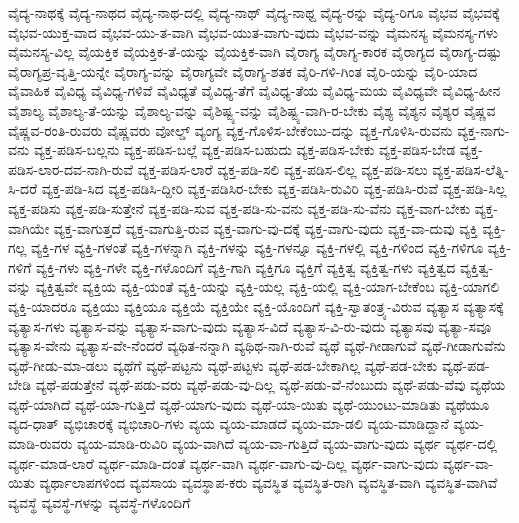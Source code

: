{ವೈದ್ಯ-ನಾಥಕ್ಕೆ
ವೈದ್ಯ-ನಾಥದ
ವೈದ್ಯ-ನಾಥ-ದಲ್ಲಿ
ವೈದ್ಯ-ನಾಥ್
ವೈದ್ಯ-ನಾಥ್ದ
ವೈದ್ಯ-ರನ್ನು
ವೈದ್ಯ-ರಿಗೂ
ವೈಭವ
ವೈಭವಕ್ಕೆ
ವೈಭವ-ಯುಕ್ತ-ವಾದ
ವೈಭವ-ಯು-ತ-ವಾಗಿ
ವೈಭವ-ಯುತ-ವಾಗು-ವುದು
ವೈಭವ-ವನ್ನು
ವೈಮನಸ್ಯ
ವೈಮನಸ್ಯ-ಗಳು
ವೈಮನಸ್ಯ-ವಿಲ್ಲ
ವೈಯಕ್ತಿಕ
ವೈಯಕ್ತಿಕ-ತೆ-ಯನ್ನು
ವೈಯಕ್ತಿಕ-ವಾಗಿ
ವೈರಾಗ್ಯ
ವೈರಾಗ್ಯ-ಕಾರಕ
ವೈರಾಗ್ಯದ
ವೈರಾಗ್ಯ-ದಷ್ಟು
ವೈರಾಗ್ಯಪ್ರ-ವೃತ್ತಿ-ಯನ್ನೇ
ವೈರಾಗ್ಯ-ವನ್ನು
ವೈರಾಗ್ಯವೇ
ವೈರಾಗ್ಯ-ಶತಕ
ವೈರಿ-ಗಳಿ-ಗಿಂತ
ವೈರಿ-ಯನ್ನು
ವೈರಿ-ಯಾದ
ವೈವಾಹಿಕ
ವೈವಿಧ್ಯ
ವೈವಿಧ್ಯ-ಗಳಿವೆ
ವೈವಿಧ್ಯತೆ
ವೈವಿಧ್ಯ-ತೆಗೆ
ವೈವಿಧ್ಯ-ತೆಯ
ವೈವಿಧ್ಯ-ಮಯ
ವೈವಿಧ್ಯವೇ
ವೈವಿಧ್ಯ-ಹೀನ
ವೈಶಾಲ್ಯ
ವೈಶಾಲ್ಯ-ತೆ-ಯನ್ನು
ವೈಶಾಲ್ಯ-ವನ್ನು
ವೈಶಿಷ್ಟ್ಯ-ವನ್ನು
ವೈಶಿಷ್ಟ್ಯ-ವಾಗಿ-ರ-ಬೇಕು
ವೈಶ್ಯ
ವೈಶ್ಯನ
ವೈಶ್ಯರ
ವೈಷ್ಣವ
ವೈಷ್ಣವ-ರಂತಿ-ರುವರು
ವೈಷ್ಣವರು
ವೋಲ್ಡ್
ವ್ಯಂಗ್ಯ
ವ್ಯಕ್ತ-ಗೊಳಿಸ-ಬೇಕೆಂಬು-ದನ್ನು
ವ್ಯಕ್ತ-ಗೊಳಿಸಿ-ರುವನು
ವ್ಯಕ್ತ-ನಾಗು-ವನು
ವ್ಯಕ್ತ-ಪಡಿಸ-ಬಲ್ಲನು
ವ್ಯಕ್ತ-ಪಡಿಸ-ಬಲ್ಲೆ
ವ್ಯಕ್ತ-ಪಡಿಸ-ಬಹುದು
ವ್ಯಕ್ತ-ಪಡಿಸ-ಬೇಕು
ವ್ಯಕ್ತ-ಪಡಿಸ-ಬೇಡ
ವ್ಯಕ್ತ-ಪಡಿಸ-ಲಾರ-ದವ-ನಾಗಿ-ರುವೆ
ವ್ಯಕ್ತ-ಪಡಿಸ-ಲಾರೆ
ವ್ಯಕ್ತ-ಪಡಿ-ಸಲಿ
ವ್ಯಕ್ತ-ಪಡಿಸ-ಲಿಲ್ಲ
ವ್ಯಕ್ತ-ಪಡಿ-ಸಲು
ವ್ಯಕ್ತ-ಪಡಿಸ-ಲೆತ್ನಿ-ಸಿ-ದರೆ
ವ್ಯಕ್ತ-ಪಡಿ-ಸಿದ
ವ್ಯಕ್ತ-ಪಡಿಸಿ-ದ್ದೀರಿ
ವ್ಯಕ್ತ-ಪಡಿಸಿರ-ಬೇಕು
ವ್ಯಕ್ತ-ಪಡಿಸಿ-ರುವಿರಿ
ವ್ಯಕ್ತ-ಪಡಿಸಿ-ರುವೆ
ವ್ಯಕ್ತ-ಪಡಿ-ಸಿಲ್ಲ
ವ್ಯಕ್ತ-ಪಡಿಸು
ವ್ಯಕ್ತ-ಪಡಿ-ಸುತ್ತೇನೆ
ವ್ಯಕ್ತ-ಪಡಿ-ಸುವ
ವ್ಯಕ್ತ-ಪಡಿ-ಸು-ವನು
ವ್ಯಕ್ತ-ಪಡಿ-ಸು-ವೆನು
ವ್ಯಕ್ತ-ವಾಗ-ಬೇಕು
ವ್ಯಕ್ತ-ವಾಗಿಯೇ
ವ್ಯಕ್ತ-ವಾಗುತ್ತದೆ
ವ್ಯಕ್ತ-ವಾಗುತ್ತಿ-ರುವ
ವ್ಯಕ್ತ-ವಾಗು-ವು-ದಕ್ಕೆ
ವ್ಯಕ್ತ-ವಾಗು-ವುದು
ವ್ಯಕ್ತ-ವಾ-ದುವು
ವ್ಯಕ್ತಿ
ವ್ಯಕ್ತಿ-ಗಲ್ಲ
ವ್ಯಕ್ತಿ-ಗಳ
ವ್ಯಕ್ತಿ-ಗಳಂತೆ
ವ್ಯಕ್ತಿ-ಗಳನ್ನಾಗಿ
ವ್ಯಕ್ತಿ-ಗಳನ್ನು
ವ್ಯಕ್ತಿ-ಗಳನ್ನೂ
ವ್ಯಕ್ತಿ-ಗಳಲ್ಲಿ
ವ್ಯಕ್ತಿ-ಗಳಿಂದ
ವ್ಯಕ್ತಿ-ಗಳಿಗೂ
ವ್ಯಕ್ತಿ-ಗಳಿಗೆ
ವ್ಯಕ್ತಿ-ಗಳು
ವ್ಯಕ್ತಿ-ಗಳೇ
ವ್ಯಕ್ತಿ-ಗಳೊಂದಿಗೆ
ವ್ಯಕ್ತಿ-ಗಾಗಿ
ವ್ಯಕ್ತಿಗೂ
ವ್ಯಕ್ತಿಗೆ
ವ್ಯಕ್ತಿತ್ವ
ವ್ಯಕ್ತಿತ್ವ-ಗಳು
ವ್ಯಕ್ತಿತ್ವದ
ವ್ಯಕ್ತಿತ್ವ-ವನ್ನು
ವ್ಯಕ್ತಿತ್ವವೇ
ವ್ಯಕ್ತಿಯ
ವ್ಯಕ್ತಿ-ಯಂತೆ
ವ್ಯಕ್ತಿ-ಯನ್ನು
ವ್ಯಕ್ತಿ-ಯಲ್ಲ
ವ್ಯಕ್ತಿ-ಯಲ್ಲಿ
ವ್ಯಕ್ತಿ-ಯಾಗ-ಬೇಕೆಂಬ
ವ್ಯಕ್ತಿ-ಯಾಗಲಿ
ವ್ಯಕ್ತಿ-ಯಾದರೂ
ವ್ಯಕ್ತಿಯು
ವ್ಯಕ್ತಿಯೂ
ವ್ಯಕ್ತಿಯೆ
ವ್ಯಕ್ತಿಯೇ
ವ್ಯಕ್ತಿ-ಯೊಂದಿಗೆ
ವ್ಯಕ್ತಿ-ಸ್ವಾತಂತ್ರ್ಯ-ವಿರುವ
ವ್ಯತ್ಯಾಸ
ವ್ಯತ್ಯಾಸಕ್ಕೆ
ವ್ಯತ್ಯಾಸ-ಗಳು
ವ್ಯತ್ಯಾಸ-ವನ್ನು
ವ್ಯತ್ಯಾಸ-ವಾಗು-ವುದು
ವ್ಯತ್ಯಾಸ-ವಿದೆ
ವ್ಯತ್ಯಾಸ-ವಿ-ರು-ವುದು
ವ್ಯತ್ಯಾಸವು
ವ್ಯತ್ಯಾ-ಸವೂ
ವ್ಯತ್ಯಾಸ-ವೇನು
ವ್ಯತ್ಯಾಸ-ವೇ-ನೆಂದರೆ
ವ್ಯಥಿತ-ನನ್ನಾಗಿ
ವ್ಯಥಿಥ-ನಾಗಿ-ರುವೆ
ವ್ಯಥೆ
ವ್ಯಥೆ-ಗೀಡಾಗುವೆ
ವ್ಯಥೆ-ಗೀಡಾಗುವೆನು
ವ್ಯಥೆ-ಗೀಡು-ಮಾ-ಡಲು
ವ್ಯಥೆಗೆ
ವ್ಯಥೆ-ಪಟ್ಟನು
ವ್ಯಥೆ-ಪಟ್ಟಳು
ವ್ಯಥೆ-ಪಡ-ಬೇಕಾಗಿಲ್ಲ
ವ್ಯಥೆ-ಪಡ-ಬೇಕು
ವ್ಯಥೆ-ಪಡ-ಬೇಡಿ
ವ್ಯಥೆ-ಪಡುತ್ತೇನೆ
ವ್ಯಥೆ-ಪಡು-ವರು
ವ್ಯಥೆ-ಪಡು-ವು-ದಿಲ್ಲ
ವ್ಯಥೆ-ಪಡು-ವೆ-ನೆಂಬುದು
ವ್ಯಥೆ-ಪಡು-ವೆವು
ವ್ಯಥೆಯ
ವ್ಯಥೆ-ಯಾಗಿದೆ
ವ್ಯಥೆ-ಯಾ-ಗುತ್ತಿದೆ
ವ್ಯಥೆ-ಯಾಗು-ವುದು
ವ್ಯಥೆ-ಯಾ-ಯಿತು
ವ್ಯಥೆ-ಯುಂಟು-ಮಾಡಿತು
ವ್ಯಥೆಯೂ
ವ್ಯದ-ಧಾತ್
ವ್ಯಭಿಚಾರಕ್ಕೆ
ವ್ಯಭಿಚಾರಿ-ಗಳು
ವ್ಯಯ
ವ್ಯಯ-ಮಾಡದೆ
ವ್ಯಯ-ಮಾ-ಡಲಿ
ವ್ಯಯ-ಮಾಡಿದ್ದಾನೆ
ವ್ಯಯ-ಮಾಡಿ-ರುವರು
ವ್ಯಯ-ಮಾಡಿ-ರುವಿರಿ
ವ್ಯಯ-ವಾಗಿದೆ
ವ್ಯಯ-ವಾ-ಗುತ್ತಿದೆ
ವ್ಯಯ-ವಾಗು-ವುದು
ವ್ಯರ್ಥ
ವ್ಯರ್ಥ-ದಲ್ಲಿ
ವ್ಯರ್ಥ-ಮಾಡ-ಲಾರೆ
ವ್ಯರ್ಥ-ಮಾಡಿ-ದಂತೆ
ವ್ಯರ್ಥ-ವಾಗಿ
ವ್ಯರ್ಥ-ವಾಗು-ವು-ದಿಲ್ಲ
ವ್ಯರ್ಥ-ವಾಗು-ವುದು
ವ್ಯರ್ಥ-ವಾ-ಯಿತು
ವ್ಯರ್ಥಾಲಾಪಗಳಿಂದ
ವ್ಯವಸಾಯ
ವ್ಯವಸ್ಥಾಪ-ಕರು
ವ್ಯವಸ್ಥಿತ
ವ್ಯವಸ್ಥಿತ-ರಾಗಿ
ವ್ಯವಸ್ಥಿತ-ವಾಗಿ
ವ್ಯವಸ್ಥಿತ-ವಾಗಿವೆ
ವ್ಯವಸ್ಥೆ
ವ್ಯವಸ್ಥೆ-ಗಳನ್ನು
ವ್ಯವಸ್ಥೆ-ಗಳೊಂದಿಗೆ
}
